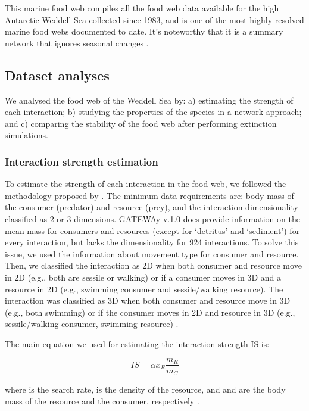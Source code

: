 \documentclass[gc, manuscript]{copernicus}
\begin{document}
This marine food web compiles all the food web data available for the
high Antarctic Weddell Sea collected since 1983, and is one of the most
highly-resolved marine food webs documented to date. It's noteworthy
that it is a summary network that ignores seasonal changes
\citep{Jacob2011}.

\subsection{Dataset analyses}

We analysed the food web of the Weddell Sea by: a) estimating the
strength of each interaction; b) studying the properties of the species
in a network approach; and c) comparing the stability of the food web
after performing extinction simulations.

\subsubsection{Interaction strength estimation}

To estimate the strength of each interaction in the food web, we
followed the methodology proposed by \citet{Pawar2012}. The minimum data
requirements are: body mass of the consumer (predator) and resource
(prey), and the interaction dimensionality classified as 2 or 3
dimensions. GATEWAy v.1.0 does provide information on the mean mass for
consumers and resources (except for `detritus' and `sediment') for every
interaction, but lacks the dimensionality for 924 interactions. To solve
this issue, we used the information about movement type for consumer and
resource. Then, we classified the interaction as 2D when both consumer
and resource move in 2D (e.g., both are sessile or walking) or if a
consumer moves in 3D and a resource in 2D (e.g., swimming consumer and
sessile/walking resource). The interaction was classified as 3D when
both consumer and resource move in 3D (e.g., both swimming) or if the
consumer moves in 2D and resource in 3D (e.g., sessile/walking consumer,
swimming resource) \citep{Pawar2012}.

The main equation we used for estimating the interaction strength IS is:

\begin{equation}
IS = \alpha x_R \frac{m_R}{m_C}
\end{equation}

where \vec{\alpha} is the search rate,  is the density of the
resource, and  and  are the body mass of the resource
and the consumer, respectively \citep{Pawar2012}.
\end{document}

